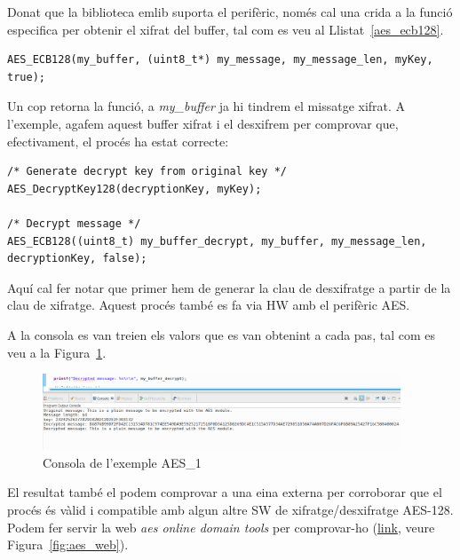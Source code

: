 Donat que la biblioteca emlib suporta el perifèric, només cal una crida a la funció especifica per obtenir el xifrat del buffer, tal com es veu al Llistat~\ref{aes_ecb128}.

\begin{lstlisting}[style=customc,caption=Operació de xifratge,label=aes_ecb128]
 AES_ECB128(my_buffer, (uint8_t*) my_message, my_message_len, myKey, true);
\end{lstlisting}

Un cop retorna la funció, a {\em my\_buffer} ja hi tindrem el missatge xifrat. A l'exemple, agafem aquest buffer xifrat i el desxifrem per comprovar que, efectivament, el procés ha estat correcte:

\begin{lstlisting}[style=customc,caption=Operació de xifratge,label=aes_ecb128]
/* Generate decrypt key from original key */
AES_DecryptKey128(decryptionKey, myKey);

/* Decrypt message */
AES_ECB128((uint8_t) my_buffer_decrypt, my_buffer, my_message_len, decryptionKey, false);
\end{lstlisting}

Aquí cal fer notar que primer hem de generar la clau de desxifratge a partir de la clau de xifratge. Aquest procés també es fa via HW amb el perifèric AES.

A la consola es van treien els valors que es van obtenint a cada pas, tal com es veu a la Figura~\ref{fig:aes_console}.

\begin{figure}
 \centering
 \includegraphics[width=0.95\textwidth, keepaspectratio]{imatges/AESWebCheckConsole.png}
 \caption{Consola de l'exemple AES\_1}
 \label{fig:aes_console}
\end{figure}

El resultat també el podem comprovar a una eina externa per corroborar que el procés és vàlid i compatible amb algun altre SW de xifratge/desxifratge AES-128. Podem fer servir la web {\em aes online domain tools} per comprovar-ho (\href{http://aes.online-domain-tools.com/}{link}, veure Figura~\ref{fig:aes_web}).

